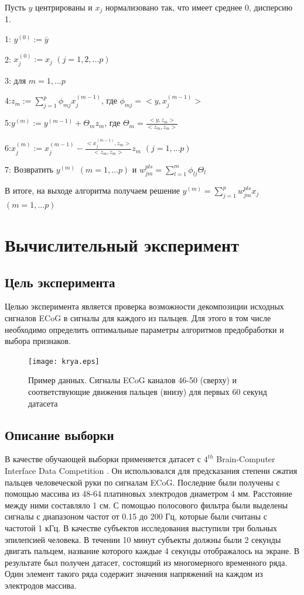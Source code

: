 \documentclass[12pt,twoside]{article}
\begin{document}
Пусть $y$ центрированы и $x_j$ нормализовано так, что имеет среднее 0, дисперсию 1.

1: $y^{(0)} := \bar{y}$

2: $x_j^{(0)} := x_j$ $(j=1,2,...p)$

3: $\textbf{для}$ $m=1,...p$

4:\space\space\space\space $z_m := \sum\limits_{j=1}^p \phi_{mj} x^{(m-1)}_j $, где $\phi_{mj} = <y, x^{(m-1)}_j >$

5:\space\space\space\space $y^{(m)} := y^{(m-1)} + \Theta_m z_m$, где $\Theta_m = \frac{<y, z_m>}{<z_m, z_m>}$

6:\space\space\space\space $x^{(m)}_j := x^{(m-1)}_j - \frac{<x^{(m-1)}_j, z_m>}{<z_m, z_m>} z_m$ $(j= 1,...p)$ 

7: Возвратить $y^{(m)}$ $(m= 1,...p)$ и $w^{pls}_{jm} = \sum\limits_{l=1}^m \phi_{lj} \Theta_l$

В итоге, на выходе алгоритма получаем решение $y^{(m)} = \sum\limits_{j=1}^p w^{pls}_{jm} x_j$ $(m = 1,...p)$


\section{Вычислительный эксперимент}
\subsection{Цель эксперимента}
Целью эксперимента является проверка возможности декомпозиции исходных сигналов ECoG в сигналы для каждого из пальцев. Для этого в том числе необходимо определить оптимальные параметры алгоритмов предобработки и выбора признаков.

\begin{figure}[h]
  \texttt{[image: krya.eps]}
  \caption{Пример данных. Сигналы ECoG каналов 46-50 (сверху) и соответствующие движения пальцев (внизу) для первых 60 секунд датасета}
  \label{fig:data}
\end{figure}

\subsection{Описание выборки}
В качестве обучающей выборки применяется датасет с $4^{th}$ Brain-Computer Interface Data Competition \cite{Miller2008}. Он использовался для предсказания степени сжатия пальцев человеческой руки по сигналам ECoG. Последние были получены с помощью массива из 48-64 платиновых электродов диаметром 4 мм. Расстояние между ними составляло 1 см. С помощью полосового фильтра были выделены сигналы с диапазоном частот от 0.15 до 200 Гц, которые были считаны с частотой 1 кГц. В качестве субъектов исследования выступили три больных эпилепсией человека. В течении 10 минут субъекты должны были 2 секунды двигать пальцем, название которого каждые 4 секунды отображалось на экране. В результате был получен датасет, состоящий из многомерного временного ряда. Один элемент такого ряда содержит значения напряжений на каждом из электродов массива. 
\end{document}
